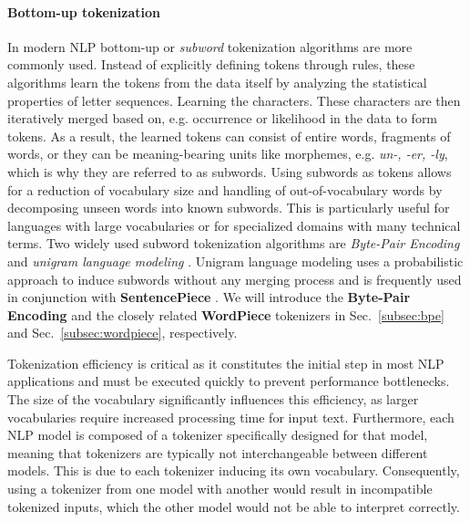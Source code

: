 \paragraph{Bottom-up tokenization} In modern NLP bottom-up or \textit{subword}
tokenization algorithms are more commonly used. Instead of explicitly defining
tokens through rules, these algorithms learn the tokens from the data itself by
analyzing the statistical properties of letter sequences. Learning the
characters. These characters are then iteratively merged based on, e.g.
occurrence or likelihood in the data to form tokens. As a result, the learned
tokens can consist of entire words, fragments of words, or they can be
meaning-bearing units like morphemes\footnotemark{}, e.g. \textit{un-, -er,
-ly}, which is why they are referred to as subwords. Using subwords as tokens
allows for a reduction of vocabulary size and handling of out-of-vocabulary
words by decomposing unseen words into known subwords. This is particularly
useful for languages with large vocabularies or for specialized domains with
many technical terms. Two widely used subword tokenization algorithms are
\textit{Byte-Pair Encoding} \cite{sennrich2016neural} and \textit{unigram
language modeling} \cite{kudo2018subword}. Unigram language modeling uses a
probabilistic approach to induce subwords without any merging process and is
frequently used in conjunction with \textbf{SentencePiece}
\cite{kudo2018sentencepiece}. We will introduce the \textbf{Byte-Pair Encoding}
and the closely related
\textbf{WordPiece}
\cite{schuster2012japanese} tokenizers in Sec.~\ref{subsec:bpe} and
Sec.~\ref{subsec:wordpiece}, respectively. \\


Tokenization efficiency is critical as it constitutes the initial step in most
NLP applications and must be executed quickly to prevent performance
bottlenecks. The size of the vocabulary significantly influences this
efficiency, as larger vocabularies require increased processing time for input
text. Furthermore, each NLP model is composed of a tokenizer specifically
designed for that model, meaning that tokenizers are typically not
interchangeable between different models. This is due to each tokenizer inducing
its own vocabulary. Consequently, using a tokenizer from one model with another
would result in incompatible tokenized inputs, which the other model would not
be able to interpret correctly.

